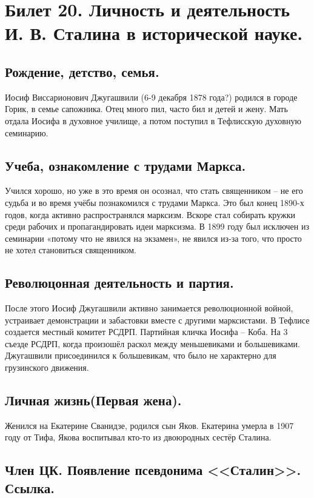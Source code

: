 \section{Билет 20. Личность и деятельность И. В. Сталина в исторической науке.}

\subsection{Рождение, детство, семья.}

Иосиф Виссарионович Джугашвили (6-9 декабря 1878 года?) родился в городе Горик, в семье сапожника. Отец много пил, часто бил и детей и жену. Мать отдала Иосифа в духовное училище, а потом поступил в Тефлисскую духовную семинарию.

\subsection{Учеба, ознакомление с трудами Маркса.}

Учился хорошо, но уже в это время он осознал, что стать священником – не его судьба и во время учёбы познакомился с трудами Маркса. Это был конец 1890-х годов, когда активно распространялся марксизм. Вскоре стал собирать кружки среди рабочих и пропагандировать идеи марксизма. В 1899 году был исключен из семинарии «потому что не явился на экзамен», не явился из-за того, что просто не хотел становиться священником.

\subsection{Революцонная деятельность и партия.}

После этого Иосиф Джугашвили активно занимается революционной войной, устраивает демонстрации и забастовки вместе с другими марксистами. В Тефлисе создается местный комитет РСДРП. Партийная кличка Иосифа – Коба. На 3 съезде РСДРП, когда произошёл раскол между меньшевиками и большевиками. Джугашвили присоединился к большевикам, что было не характерно для грузинского движения.

\subsection{Личная жизнь(Первая жена).}

Женился на Екатерине Сванидзе, родился сын Яков. Екатерина умерла в 1907 году от Тифа, Якова воспитывал кто-то из двоюродных сестёр Сталина. 

\subsection{Член ЦК. Появление псевдонима <<Сталин>>. Ссылка.}

